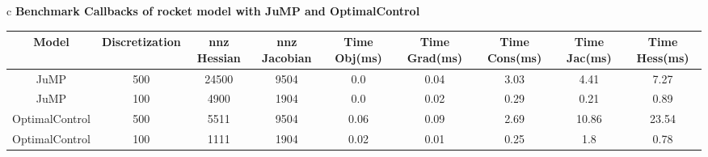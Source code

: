 \documentclass{standalone}
\begin{document}
\begin{tabular}{c}
\Large\textbf{Benchmark Callbacks of rocket model with JuMP and OptimalControl}\\
\begin{tabular}{ccccccccc}
  \hline
  \textbf{Model} & \textbf{Discretization} & \textbf{nnz Hessian} & \textbf{nnz Jacobian} & \textbf{Time Obj(ms)} & \textbf{Time Grad(ms)} & \textbf{Time Cons(ms)} & \textbf{Time Jac(ms)} & \textbf{Time Hess(ms)} \\\hline
  JuMP & 500 & 24500 & 9504 & 0.0 & 0.04 & 3.03 & 4.41 & 7.27 \\
  JuMP & 100 & 4900 & 1904 & 0.0 & 0.02 & 0.29 & 0.21 & 0.89 \\
  OptimalControl & 500 & 5511 & 9504 & 0.06 & 0.09 & 2.69 & 10.86 & 23.54 \\
  OptimalControl & 100 & 1111 & 1904 & 0.02 & 0.01 & 0.25 & 1.8 & 0.78 \\\hline
\end{tabular}
\end{tabular}
\end{document}
